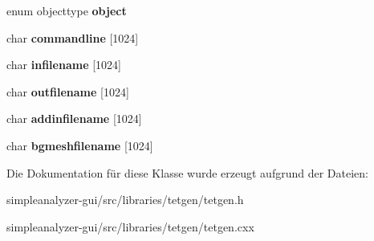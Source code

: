 \begin{DoxyCompactItemize}
\item 
\hypertarget{classtetgenbehavior_a353935d1a081b67fba44c1a630c36ccb}{enum objecttype {\bfseries object}}\label{classtetgenbehavior_a353935d1a081b67fba44c1a630c36ccb}

\item 
\hypertarget{classtetgenbehavior_a56dcfc2ab395c63b7f99d84b2cd1f4e8}{char {\bfseries commandline} \mbox{[}1024\mbox{]}}\label{classtetgenbehavior_a56dcfc2ab395c63b7f99d84b2cd1f4e8}

\item 
\hypertarget{classtetgenbehavior_ac879f6843038d5428199079c515ce6e6}{char {\bfseries infilename} \mbox{[}1024\mbox{]}}\label{classtetgenbehavior_ac879f6843038d5428199079c515ce6e6}

\item 
\hypertarget{classtetgenbehavior_aa066e0b8f2b5b3d0f9e5c6b74e8eadc4}{char {\bfseries outfilename} \mbox{[}1024\mbox{]}}\label{classtetgenbehavior_aa066e0b8f2b5b3d0f9e5c6b74e8eadc4}

\item 
\hypertarget{classtetgenbehavior_a627804470698cc1883fd93999727e334}{char {\bfseries addinfilename} \mbox{[}1024\mbox{]}}\label{classtetgenbehavior_a627804470698cc1883fd93999727e334}

\item 
\hypertarget{classtetgenbehavior_ae72a1c6b8d7389d4fad21fa584207aba}{char {\bfseries bgmeshfilename} \mbox{[}1024\mbox{]}}\label{classtetgenbehavior_ae72a1c6b8d7389d4fad21fa584207aba}

\end{DoxyCompactItemize}


Die Dokumentation für diese Klasse wurde erzeugt aufgrund der Dateien\-:\begin{DoxyCompactItemize}
\item 
simpleanalyzer-\/gui/src/libraries/tetgen/tetgen.\-h\item 
simpleanalyzer-\/gui/src/libraries/tetgen/tetgen.\-cxx\end{DoxyCompactItemize}
